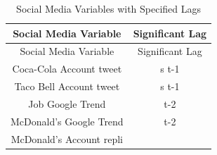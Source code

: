 \documentclass[12pt,oneside]{chicagocapstone}
\begin{document}
\begin{longtable}[]{@{}cc@{}}
\caption{\label{tab:inher} Social Media Variables with Specified
Lags}\tabularnewline
\toprule
\begin{minipage}[b]{0.34\columnwidth}\centering\strut
Social Media Variable\strut
\end{minipage} & \begin{minipage}[b]{0.43\columnwidth}\centering\strut
Significant Lag\strut
\end{minipage}\tabularnewline
\midrule
\endfirsthead
\toprule
\begin{minipage}[b]{0.34\columnwidth}\centering\strut
Social Media Variable\strut
\end{minipage} & \begin{minipage}[b]{0.43\columnwidth}\centering\strut
Significant Lag\strut
\end{minipage}\tabularnewline
\midrule
\endhead
\begin{minipage}[t]{0.34\columnwidth}\centering\strut
Coca-Cola Account tweet\strut
\end{minipage} & \begin{minipage}[t]{0.43\columnwidth}\centering\strut
s t-1\strut
\end{minipage}\tabularnewline
\begin{minipage}[t]{0.34\columnwidth}\centering\strut
Taco Bell Account tweet\strut
\end{minipage} & \begin{minipage}[t]{0.43\columnwidth}\centering\strut
s t-1\strut
\end{minipage}\tabularnewline
\begin{minipage}[t]{0.34\columnwidth}\centering\strut
Job Google Trend\strut
\end{minipage} & \begin{minipage}[t]{0.43\columnwidth}\centering\strut
t-2\strut
\end{minipage}\tabularnewline
\begin{minipage}[t]{0.34\columnwidth}\centering\strut
McDonald's Google Trend\strut
\end{minipage} & \begin{minipage}[t]{0.43\columnwidth}\centering\strut
t-2\strut
\end{minipage}\tabularnewline
\begin{minipage}[t]{0.34\columnwidth}\centering\strut
McDonald's Account repli\strut
\end{minipage} & \begin{minipage}[t]{0.43\columnwidth}\centering\strut

\end{minipage}
\end{longtable}
\end{document}

